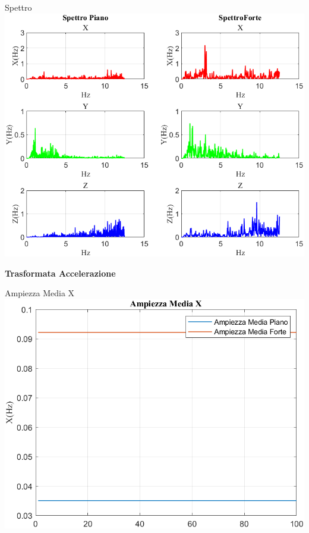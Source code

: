 \documentclass[beamer]{standalone}
\begin{document}
	\begin{frame}{{Spettro}}
		\centering\includegraphics[height=.8\textheight]{figure/Acc/Trasformata/Spettro}
	\end{frame}
	
	\begin{frame}
		\color{blue}\centering\huge{\textbf{Trasformata Accelerazione}}
	\end{frame}
	
	\begin{frame}{{Ampiezza Media X}}					
		\centering\includegraphics[height=.8\textheight]{figure/Acc/Trasformata/Ampiezza MediaX}
	\end{frame}
\end{document}
